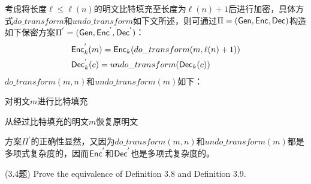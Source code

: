 \begin{questions}
        \begin{solution}
            \newline
            考虑将长度$\ell\leq\ell(n)$的明文比特填充至长度为$\ell(n)+1$后进行加密，具体方式$do\_transform$和$undo\_transform$如下文所述，则可通过$\Pi=(\mathsf{Gen},\mathsf{Enc},\mathsf{Dec})$构造如下保密方案$\Pi^{'}=(\mathsf{Gen},\mathsf{Enc}^{'},\mathsf{Dec}^{'})$：\\
                \begin{equation}
                    \begin{aligned}
                        & \mathsf{Enc}_k^{'}(m)=\mathsf{Enc}_k(do\_transform(m, \ell(n)+1))\\
                        & \mathsf{Dec}_k^{'}(c)=undo\_transform(\mathsf{Dec}_k(c))
                    \end{aligned}
                \end{equation}
            $do\_transform(m,n)$和$undo\_transform(m)$如下：\\
                \begin{algorithm}[H]
                \caption{对明文$m$进行比特填充}
                \end{algorithm}
                \begin{algorithm}[H]
                \caption{从经过比特填充的明文$m$恢复原明文}
                \end{algorithm}
            方案$\Pi^{'}$的正确性显然，又因为$do\_transform(m,n)$和$undo\_transform(m)$都是多项式复杂度的，因而$\mathsf{Enc}^{'}$和$\mathsf{Dec}^{'}$也是多项式复杂度的。
        \end{solution}

    \question (3.4题) Prove the equivalence of Definition 3.8 and Definition 3.9.


\end{questions}
